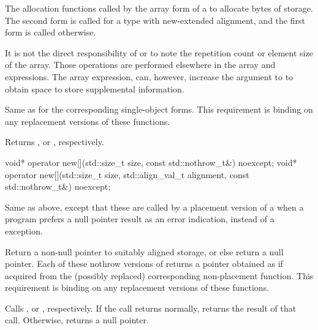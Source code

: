 \begin{itemdescr}
\pnum
\effects
The
allocation functions
called by the array form of a
to allocate
 bytes of storage.
The second form is called for a type with new-extended alignment, and
the first form is called otherwise.
\begin{footnote}
It is not the direct responsibility of
or
to note the repetition count or element size of the array.
Those operations are performed elsewhere in the array
and
expressions.
The array
expression, can, however, increase the  argument to
to obtain space to store supplemental information.
\end{footnote}

\pnum
\replaceable
{}

\pnum
\required
Same as for
the corresponding single-object forms.
This requirement is binding on any replacement versions of these functions.

\pnum
{}
Returns
,
or
,
respectively.
\end{itemdescr}

%
\begin{itemdecl}
void* operator new[](std::size_t size, const std::nothrow_t&) noexcept;
void* operator new[](std::size_t size, std::align_val_t alignment, const std::nothrow_t&) noexcept;
\end{itemdecl}

\begin{itemdescr}
\pnum
\effects
Same as above, except that these are called by a placement version of a
when a \Cpp{} program prefers a null pointer result as an error indication,
instead of a
exception.

\pnum
\replaceable
{}

\pnum
\required
Return a non-null pointer to suitably aligned storage,
or else return a null pointer.
Each of these nothrow versions of
returns a pointer obtained as if
acquired from the (possibly replaced)
corresponding non-placement function.
This requirement is binding on any replacement versions of these functions.

\pnum
{}
Calls ,
or ,
respectively.
If the call returns normally,
returns the result of that call.
Otherwise, returns a null pointer.
\end{itemdescr}


